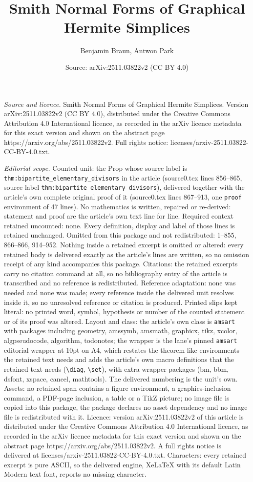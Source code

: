 \documentclass[10pt,a4paper]{amsart}
\title[Smith Normal Forms of Graphical Hermite Simplices]{Smith Normal Forms of Graphical Hermite Simplices}
\author{Benjamin Braun, Antwon Park}
\date{Source: arXiv:2511.03822v2 (CC BY 4.0)}
\begin{document}
\maketitle

\noindent\emph{Source and licence.} Smith Normal Forms of Graphical Hermite Simplices. Version arXiv:2511.03822v2 (CC BY 4.0), distributed under the Creative Commons Attribution 4.0 International licence, as recorded in the arXiv licence metadata for this exact version and shown on the abstract page https://arxiv.org/abs/2511.03822v2. Full rights notice: licenses/arxiv-2511.03822-CC-BY-4.0.txt.\par\smallskip

\noindent\textit{Editorial scope.} Counted unit: the Prop whose source label is \texttt{thm:bipartite\_elementary\_divisors} in the article (source0.tex lines 856--865, source label \texttt{thm:bipartite\_elementary\_divisors}), delivered together with the article's own complete original proof of it (source0.tex lines 867--913, one \texttt{proof} environment of 47 lines). No mathematics is written, repaired or re-derived: statement and proof are the article's own text line for line. Required context retained uncounted: none. Every definition, display and label of those lines is retained unchanged. Omitted from this package and not redistributed: 1--855, 866--866, 914--952. Nothing inside a retained excerpt is omitted or altered: every retained body is delivered exactly as the article's lines are written, so no omission receipt of any kind accompanies this package. Citations: the retained excerpts carry no citation command at all, so no bibliography entry of the article is transcribed and no reference is redistributed. Reference adaptation: none was needed and none was made; every reference inside the delivered unit resolves inside it, so no unresolved reference or citation is produced. Printed slips kept literal: no printed word, symbol, hypothesis or number of the counted statement or of its proof was altered. Layout and class: the article's own class is \texttt{amsart} with packages including geometry, amssymb, amsmath, graphicx, tikz, xcolor, algpseudocode, algorithm, todonotes; the wrapper is the lane's pinned \texttt{amsart} editorial wrapper at 10pt on A4, which restates the theorem-like environments the retained text needs and adds the article's own macro definitions that the retained text needs (\texttt{\textbackslash diag}, \texttt{\textbackslash set}), with extra wrapper packages (bm, bbm, dsfont, xspace, cancel, mathtools). The delivered numbering is the unit's own. Assets: no retained span contains a figure environment, a graphics-inclusion command, a PDF-page inclusion, a table or a TikZ picture; no image file is copied into this package, the package declares no asset dependency and no image file is redistributed with it. Licence: version arXiv:2511.03822v2 of this article is distributed under the Creative Commons Attribution 4.0 International licence, as recorded in the arXiv licence metadata for this exact version and shown on the abstract page https://arxiv.org/abs/2511.03822v2. A full rights notice is delivered at licenses/arxiv-2511.03822-CC-BY-4.0.txt. Characters: every retained excerpt is pure ASCII, so the delivered engine, XeLaTeX with its default Latin Modern text font, reports no missing character.
\end{document}
